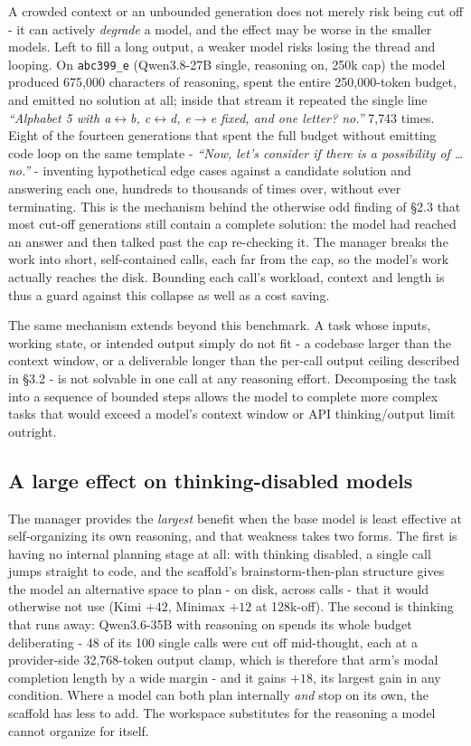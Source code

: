 \documentclass[11pt]{article}
\begin{document}
A crowded context or an unbounded generation does not merely risk being cut off - it can
actively \textit{degrade} a model, and the effect may be worse in the smaller models. Left
to fill a long output, a weaker model risks losing the thread and looping. On
\texttt{abc399\_e} (Qwen3.8-27B single, reasoning on, 250k cap) the model produced 675{,}000
characters of reasoning, spent the entire 250{,}000-token budget, and emitted no solution
at all; inside that stream it repeated the single line \textit{``Alphabet 5 with
a$\leftrightarrow$b, c$\leftrightarrow$d, e$\to$e fixed, and one letter? no.''}
7{,}743 times. Eight of the fourteen generations that spent the full budget without
emitting code loop on the same template - \textit{``Now, let's consider if there is a
possibility of \dots{} no.''} - inventing hypothetical edge cases against a candidate
solution and answering each one, hundreds to thousands of times over, without ever
terminating. This is the mechanism behind the otherwise odd finding of \S2.3 that most
cut-off generations still contain a complete solution: the model had reached an answer and
then talked past the cap re-checking it. The manager breaks the work into short,
self-contained calls, each far from the cap, so the model's work actually reaches the disk. Bounding each
call's workload, context and length is thus a guard against this collapse as well as a cost
saving.

The same mechanism extends beyond this benchmark. A task whose inputs, working state, or
intended output simply do not fit - a codebase larger than the context window, or a
deliverable longer than the per-call output ceiling described in \S3.2 - is not solvable
in one call at any reasoning effort. Decomposing the task into a sequence of bounded steps
allows the model to complete more complex tasks that would exceed a model's context window
or API thinking/output limit outright.

\subsection{A large effect on thinking-disabled models}

The manager provides the \textit{largest} benefit when the base model is least effective at
self-organizing its own reasoning, and that weakness takes two forms. The first is having
no internal planning stage at all: with thinking disabled, a single call jumps straight to
code, and the scaffold's brainstorm-then-plan structure gives the model an
alternative space to plan - on disk, across calls - that it would otherwise
not use (Kimi $+42$, Minimax $+12$ at 128k-off). The second is thinking that runs away:
Qwen3.6-35B with reasoning on spends its whole budget deliberating - 48 of its 100
single calls were cut off mid-thought, each at a provider-side 32,768-token output clamp,
which is therefore that arm's modal completion length by a wide margin - and it gains $+18$, its
largest gain in any condition. Where a model can both plan internally \textit{and} stop on
its own, the scaffold has less to add. The workspace
substitutes for the reasoning a model cannot organize for itself.
\end{document}
